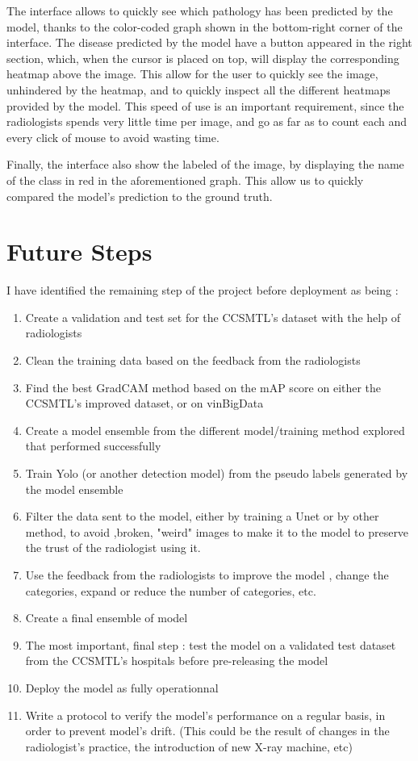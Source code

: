 \documentclass[11pt]{article}
\begin{document}
            The interface allows to quickly see which pathology has been predicted by the model, thanks to the color-coded graph shown in the bottom-right corner of the interface. The disease predicted by the model
            have a button appeared in the right section, which, when the cursor is placed on top, will display the corresponding heatmap above the image. This allow for the user to quickly see the image, unhindered by the heatmap,
            and to quickly inspect all the different heatmaps provided by the model. This speed of use is an important requirement, since the radiologists spends very little time per image, and go as far as to count each and every click
            of mouse to avoid wasting time.

            Finally, the interface also show the labeled of the image, by displaying the name of the class in red in the aforementioned graph. This allow us to quickly compared the model's prediction to the ground truth.

        \section{Future Steps}
            I have identified the remaining step of the project before deployment as being :
            \begin{enumerate}
            \item Create a validation and test set for the CCSMTL's dataset with the help of radiologists
            \item Clean the training data based on the feedback from the radiologists
            \item Find the best GradCAM method based on the mAP score on either the CCSMTL's improved dataset, or on vinBigData
            \item Create a model ensemble from the different model/training method explored that performed successfully
            \item Train Yolo (or another detection model) from the pseudo labels generated by the model ensemble
            \item Filter the data sent to the model, either by training a Unet or by other method, to avoid ,broken, "weird" images to make it to the model
            to preserve the trust of the radiologist using it.
            \item Use the feedback from the radiologists to improve the model , change the categories, expand or reduce the number of categories, etc.
            \item Create a final ensemble of model
            \item The most important, final step : test the model on a validated test dataset from the CCSMTL's hospitals before pre-releasing the model
            \item Deploy the model as fully operationnal
            \item Write a protocol to verify the model's performance on a regular basis, in order to prevent model's drift. (This could be the result of changes in the radiologist's practice,
            the introduction of new X-ray machine, etc)
            \end{enumerate}
\end{document}
